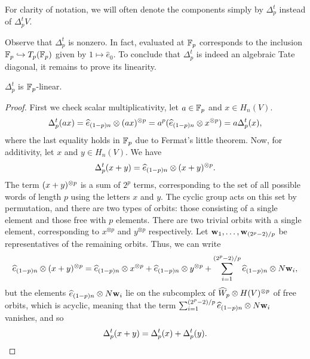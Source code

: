 For clarity of notation, we will often denote the components simply by \(\Delta^t_p\) instead of \(\Delta^t_pV\).

Observe that \(\Delta^t_p\) is nonzero.
In fact, evaluated at \({\mathbb{F}_p}\) corresponds to the inclusion \({\mathbb{F}_p} \hookrightarrow T_p({\mathbb{F}_p})\) given by \(1 \mapsto \widehat e_0\).
To conclude that \(\Delta^t_p\) is indeed an algebraic Tate diagonal, it remains to prove its linearity.

\begin{lemma}\label{linearity}
	\(\Delta^t_p\) is \(\mathbb{F}_p\)-linear.
\end{lemma}

\begin{proof}
	First we check scalar multiplicativity, let \(a \in \mathbb{F}_p\) and \(x \in H_n(V)\).
	\[
	\Delta^t_p(ax) = \widehat e_{(1-p)n} \otimes (ax)^{\otimes p} = a^p(\widehat e_{(1-p)n} \otimes x^{\otimes p}) = a\Delta^t_p(x),
	\]
	where the last equality holds in \(\mathbb{F}_p\) due to Fermat's little theorem.
	Now, for additivity, let \(x\) and \(y \in H_n(V)\).
	We have
	\[
	\Delta^t_p(x+y) = \widehat e_{(1-p)n} \otimes (x+y)^{\otimes p}.
	\]
	The term \((x+y)^{\otimes p}\) is a sum of \(2^p\) terms, corresponding to the set of all possible words of length \(p\) using the letters \(x\) and \(y\).
	The cyclic group acts on this set by permutation, and there are two types of orbits: those consisting of a single element and those free with \(p\) elements.
	There are two trivial orbits with a single element, corresponding to \(x^{\otimes p}\) and \(y^{\otimes p}\) respectively.
	Let \({\bf w}_1,\dots,{\bf w}_{(2^p-2)/p}\) be representatives of the remaining orbits.
	Thus, we can write
	\[
	\widehat e_{(1-p)n} \otimes (x+y)^{\otimes p} = \widehat e_{(1-p)n} \otimes x^{\otimes p} + \widehat e_{(1-p)n} \otimes y^{\otimes p} + \sum_{i=1}^{(2^p-2)/p} \widehat e_{(1-p)n} \otimes N{\bf w}_i,
	\]
	but the elements \(\widehat e_{(1-p)n} \otimes N{\bf w}_i\) lie on the subcomplex of \(\widehat W_p \otimes H(V)^{\otimes p}\) of free orbits, which is acyclic, meaning that the term \(\sum_{i=1}^{(2^p-2)/p} \widehat e_{(1-p)n} \otimes N{\bf w}_i\) vanishes, and so
	\[
	\Delta^t_p(x+y) = \Delta^t_p(x) + \Delta^t_p(y).\qedhere
	\]
\end{proof}

